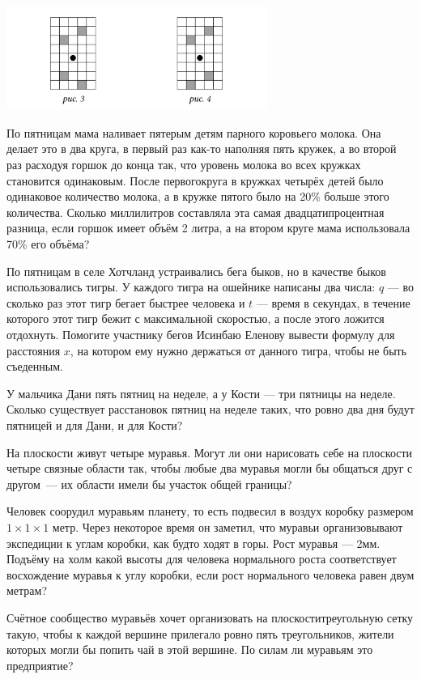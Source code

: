 \begin{center}
  \includegraphics[width=8.5cm]{stats/2016/Figures/Corbleud.png}
\end{center}

\begin{itemize}
\itA По пятницам мама наливает пятерым детям парного коровьего молока. Она делает это в два круга, в первый раз как-то наполняя пять кружек, а во второй раз расходуя горшок до конца так, что уровень молока во всех кружках становится одинаковым. После первого\linebreak круга в кружках четырёх детей было одинаковое количество молока, а в кружке пятого было на 20\% больше этого количества. Сколько миллилитров составляла эта самая двадцатипроцентная разница, если горшок имеет объём 2 литра, а на втором круге мама использовала 70\% его объёма?

\itB По пятницам в селе Хотчланд устраивались бега быков, но в качестве быков использовались тигры. У каждого тигра на ошейнике написаны два числа: $q$ — во сколько раз этот тигр бегает быстрее человека и $t$ — время в секундах, в течение которого этот тигр бежит с максимальной скоростью, а после этого ложится отдохнуть. Помогите участнику бегов Исинбаю Еленову вывести формулу для расстояния $x$, на котором ему нужно держаться от данного тигра, чтобы не быть съеденным.

\itC У мальчика Дани пять пятниц на неделе, а у Кости — три пятницы на неделе. Сколько существует расстановок пятниц на неделе таких, что ровно два дня будут пятницей и для Дани, и для Кости?
\end{itemize}

\begin{itemize}
\itA На плоскости живут четыре муравья. Могут ли они нарисовать себе на плоскости четыре связные области так, чтобы любые два муравья могли бы общаться друг с другом~— их области имели бы участок общей границы?

\itB Человек соорудил муравьям планету, то есть подвесил в воздух коробку размером $1 \times 1 \times 1$ метр. Через некоторое время он заметил, что муравьи организовывают экспедиции к углам коробки, как будто ходят в горы. Рост муравья — 2мм. Подъёму на холм какой высоты для человека нормального роста соответствует восхождение муравья к углу коробки, если рост нормального человека равен двум метрам?

\itC Счётное сообщество муравьёв хочет организовать на плоскости\linebreak треугольную сетку такую, чтобы к каждой вершине прилегало ровно пять треугольников, жители которых могли бы попить чай в этой вершине. По силам ли муравьям это предприятие?
\end{itemize}

